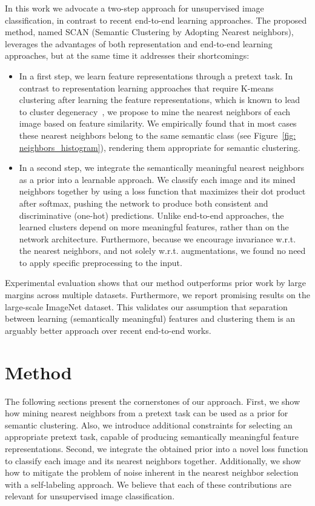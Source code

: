 \documentclass[runningheads]{llncs}
\begin{document}
In this work we advocate a two-step approach for unsupervised image classification, in contrast to recent end-to-end learning approaches. The proposed method, named SCAN (Semantic Clustering by Adopting Nearest neighbors), leverages the advantages of both representation and end-to-end learning approaches, but at the same time it addresses their shortcomings: 
\begin{itemize}
\item In a first step, we learn feature representations through a pretext task. In contrast to representation learning approaches that require K-means clustering after learning the feature representations, which is known to lead to cluster degeneracy~\cite{DeepCluster}, we propose to mine the nearest neighbors of each image based on feature similarity. We empirically found that in most cases these nearest neighbors belong to the same semantic class (see Figure~\ref{fig: neighbors_histogram}), rendering them appropriate for semantic clustering. 
\item In a second step, we integrate the semantically meaningful nearest neighbors as a prior into a learnable approach. We classify each image and its mined neighbors together by using a loss function that maximizes their dot product after softmax, pushing the network to produce both consistent and discriminative (one-hot) predictions. Unlike end-to-end approaches, the learned clusters depend on more meaningful features, rather than on the network architecture. Furthermore, because we encourage invariance w.r.t. the nearest neighbors, and not solely w.r.t. augmentations, we found no need to apply specific preprocessing to the input. 
\end{itemize}

Experimental evaluation shows that our method outperforms prior work by large margins across multiple datasets. Furthermore, we report promising results on the large-scale ImageNet dataset. This validates our assumption that separation between learning (semantically meaningful) features and clustering them is an arguably better approach over recent end-to-end works.  \section{Method}
\label{sec:method}

The following sections present the cornerstones of our approach. First, we show how mining nearest neighbors from a pretext task can be used as a prior for semantic clustering. Also, we introduce additional constraints for selecting an appropriate pretext task, capable of producing semantically meaningful feature representations. Second, we integrate the obtained prior into a novel loss function to classify each image and its nearest neighbors together. Additionally, we show how to mitigate the problem of noise inherent in the nearest neighbor selection with a self-labeling approach. We believe that each of these contributions are relevant for unsupervised image classification.  
\end{document}
